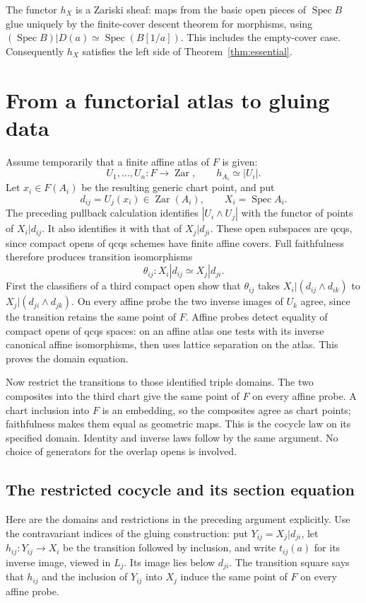 \documentclass[11pt]{amsart}
\theoremstyle{definition}\newtheorem{definition}[theorem]{Definition}
\theoremstyle{remark}\newtheorem{remark}[theorem]{Remark}
\newcommand{\Spec}{\operatorname{Spec}}
\newcommand{\Zar}{\operatorname{Zar}}
\begin{document}
The functor $h_X$ is a Zariski sheaf: maps from the basic open pieces
of $\Spec B$ glue uniquely by the finite-cover descent theorem for
morphisms, using $(\Spec B)|D(a)\simeq\Spec(B[1/a])$. This includes
the empty-cover case. Consequently $h_X$ satisfies the left side of
Theorem~\ref{thm:essential}.

\section{From a functorial atlas to gluing data}
Assume temporarily that a finite affine atlas of $F$ is given:
\[
 U_1,\ldots,U_n:F\to\Zar,\qquad h_{A_i}\simeq|U_i|.
\]
Let $x_i\in F(A_i)$ be the resulting generic chart point, and put
\[
 d_{ij}=U_j(x_i)\in\Zar(A_i),\qquad X_i=\Spec A_i.
\]
The preceding pullback calculation identifies $|U_i\wedge U_j|$ with
the functor of points of $X_i|d_{ij}$. It also identifies it with that
of $X_j|d_{ji}$. These open subspaces are qcqs, since compact opens of
qcqs schemes have finite affine covers. Full faithfulness therefore
produces transition isomorphisms
\[
 \theta_{ij}:X_i|d_{ij}\simeq X_j|d_{ji}.
\]
First the classifiers of a third compact open show that $\theta_{ij}$ takes
$X_i|(d_{ij}\wedge d_{ik})$ to
$X_j|(d_{ji}\wedge d_{jk})$. On every affine probe the two inverse
images of $U_k$ agree, since the transition retains the same point of
$F$. Affine probes detect equality of compact opens of qcqs spaces:
on an affine atlas one tests with its inverse canonical affine
isomorphisms, then uses lattice separation on the atlas. This proves
the domain equation.

Now restrict the transitions to those identified triple domains. The
two composites into the third chart give the same point of $F$ on
every affine probe. A chart inclusion into $F$ is an embedding, so the
composites agree as chart points; faithfulness makes them equal as
geometric maps. This is the cocycle law on its specified domain.
Identity and inverse laws follow by the same argument. No choice of
generators for the overlap opens is involved.

\subsection*{The restricted cocycle and its section equation}
Here are the domains and restrictions in the preceding argument explicitly.
Use the contravariant indices of the gluing construction: put
$Y_{ij}=X_j|d_{ji}$, let $h_{ij}:Y_{ij}\to X_i$ be the transition
followed by inclusion, and write $t_{ij}(a)$ for its inverse image,
viewed in $L_j$. Its image lies below $d_{ji}$. The transition square
says that $h_{ij}$ and the inclusion of $Y_{ij}$ into $X_j$ induce the
same point of $F$ on every affine probe.
\end{document}
